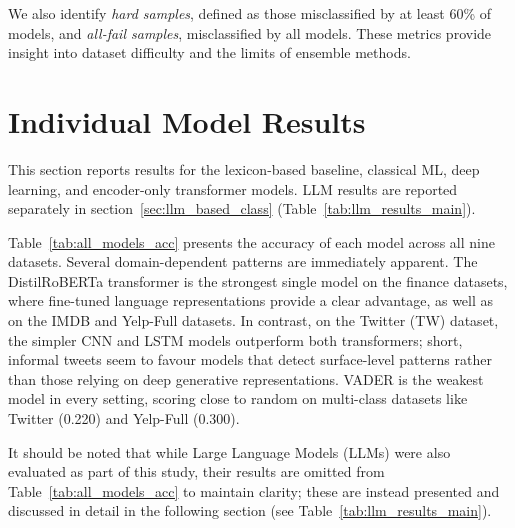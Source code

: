 \documentclass[conference]{IEEEtran}
\begin{document}
We also identify \textit{hard samples}, defined as those misclassified by at least 60\% of models, and \textit{all-fail samples}, misclassified by all models. These metrics provide insight into dataset difficulty and the limits of ensemble methods.

\section{Individual Model Results}

This section reports results for the lexicon-based baseline, classical ML, deep learning, and encoder-only transformer models. LLM results are reported separately in section~\ref{sec:llm_based_class} (Table~\ref{tab:llm_results_main}).

Table~\ref{tab:all_models_acc} presents the accuracy of each model across all nine datasets. Several domain-dependent patterns are immediately apparent. The DistilRoBERTa transformer is the strongest single model on the finance datasets, where fine-tuned language representations provide a clear advantage, as well as on the IMDB and Yelp-Full datasets. In contrast, on the Twitter (TW) dataset, the simpler CNN and LSTM models outperform both transformers; short, informal tweets seem to favour models that detect surface-level patterns rather than those relying on deep generative representations. VADER is the weakest model in every setting, scoring close to random on multi-class datasets like Twitter (0.220) and Yelp-Full (0.300).

It should be noted that while Large Language Models (LLMs) were also evaluated as part of this study, their results are omitted from Table~\ref{tab:all_models_acc} to maintain clarity; these are instead presented and discussed in detail in the following section (see Table~\ref{tab:llm_results_main}).
\end{document}

